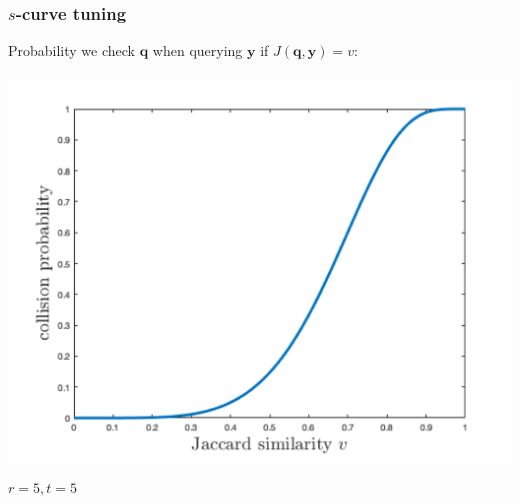 \documentclass[compress]{beamer}
\newcommand{\bv}[1]{\mathbf{#1}}
\begin{document}
%	
%
%	
%
%	

\begin{frame}
	\frametitle{$s$-curve tuning}
	Probability we check $\bv{q}$ when querying $\bv{y}$ if $J(\bv{q},\bv{y}) = v$:
	\begin{align*}
	\end{align*}
	\begin{center}
		\includegraphics[width=.6\textwidth]{scurve_5_5.png}
		
		$r = 5, t = 5$
	\end{center}
\end{frame}
\end{document}
